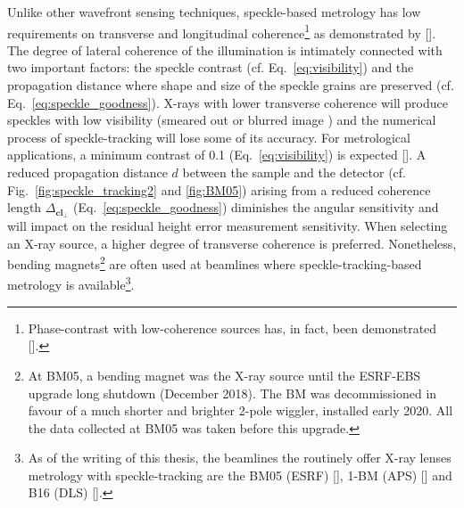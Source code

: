 \begin{refsection}
Unlike other wavefront sensing techniques, speckle-based metrology has low requirements on transverse and longitudinal coherence\footnote{Phase-contrast with low-coherence sources has, in fact, been demonstrated [\cite{Cloetens1996, Wilkins1996, Pfeiffer2006, Munro2012}].} as demonstrated by [\cite{Zanette2014,Zdora2015,Wang2016}]. The degree of lateral coherence of the illumination is intimately connected with two important factors: the speckle contrast (cf. Eq.~\ref{eq:visibility}) and the propagation distance where shape and size of the speckle grains are preserved (cf. Eq.~\ref{eq:speckle_goodness}). X-rays with lower transverse coherence will produce speckles with low visibility (smeared out or blurred image ) and the numerical process of speckle-tracking will lose some of its accuracy. For metrological applications, a minimum contrast of 0.1 (Eq.~\ref{eq:visibility}) is expected [\cite{Berujon2020a}]. A reduced propagation distance $d$ between the sample and the detector (cf. Fig.~\ref{fig:speckle_tracking2} and \ref{fig:BM05}) arising from a reduced coherence length $\Delta_{\textbf{cl}_\perp}$ (Eq.~\ref{eq:speckle_goodness}) diminishes the angular sensitivity and will impact on the residual height error measurement sensitivity. When selecting an X-ray source, a higher degree of transverse coherence is preferred. Nonetheless, bending magnets\footnote{At BM05, a bending magnet was the X-ray source until the ESRF-EBS upgrade long shutdown (December 2018). The BM was decommissioned in favour of a much shorter and brighter 2-pole wiggler, installed early 2020. All the data collected at BM05 was taken before this upgrade.} are often used at beamlines where speckle-tracking-based metrology is available\footnote{As of the writing of this thesis, the beamlines the routinely offer X-ray lenses metrology with speckle-tracking are the BM05 (ESRF) [\cite{Berujon2020a}], 1-BM (APS) [\cite{Qiao2020}] and B16 (DLS) [\cite{Sawhney2013}].}. 


\end{refsection}
